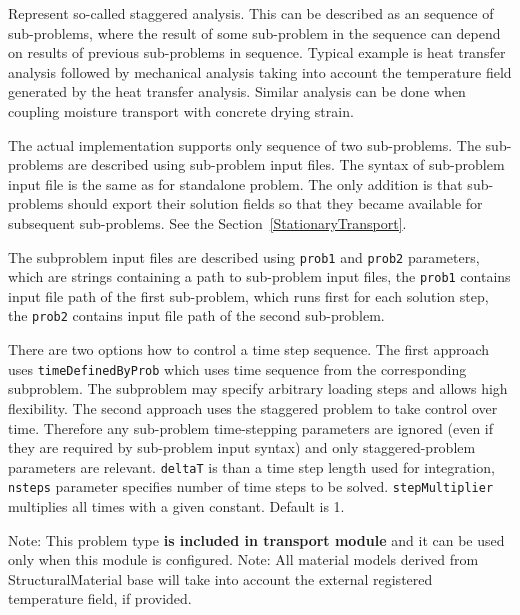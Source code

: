 \documentclass[a4paper]{article}
\newcommand{\param}[1]{\texttt{#1}} %
\begin{document}
Represent so-called staggered analysis. This can be described as an
sequence of sub-problems, where the result of some sub-problem in the
sequence can depend on results of previous sub-problems in sequence.
Typical example is heat transfer analysis followed by mechanical
analysis taking into account the temperature field generated by the
heat transfer analysis. Similar analysis can be done when coupling
moisture transport with concrete drying strain.

The actual implementation supports only sequence of two sub-problems.
The sub-problems are described using sub-problem input files. The
syntax of sub-problem input file is the same as for standalone
problem. The only addition is that sub-problems should export their
solution fields so that they became available for subsequent
sub-problems. See the Section~\ref{StationaryTransport}.

The subproblem input files are described using
\param{prob1} and \param{prob2} parameters, which are strings
containing a path to sub-problem input files, the \param{prob1}
contains input file path of the first sub-problem, which runs first
for each solution step, the \param{prob2} contains input file path of
the second sub-problem. 

There are two options how to control a time step sequence. The first approach
uses \param{timeDefinedByProb} which uses time sequence from the corresponding subproblem. 
The subproblem may specify arbitrary loading steps and allows high flexibility.
The second approach uses the staggered problem to take control over time. Therefore any
sub-problem time-stepping parameters are ignored (even if they are
required by sub-problem input syntax) and only staggered-problem
parameters are relevant. \param{deltaT} is than a time step length used for
integration, \param{nsteps} parameter specifies
number of time steps to be solved. \param{stepMultiplier} multiplies all 
times with a given constant. Default is 1.

Note: This problem type \textbf{is included in transport module} and it
can be used only when this module is configured.
Note: All material models derived from StructuralMaterial base will
take into account the external registered temperature field, if
provided.
\end{document}
